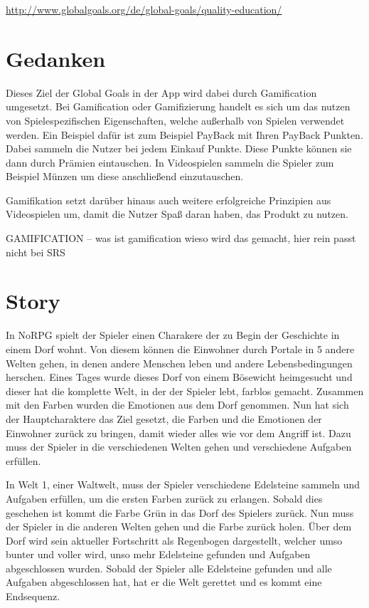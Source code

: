 	\url{http://www.globalgoals.org/de/global-goals/quality-education/}

	
\section{Gedanken}

Dieses Ziel der Global Goals in der App wird dabei durch Gamification umgesetzt. Bei Gamification oder Gamifizierung handelt es sich um das nutzen von Spielespezifischen Eigenschaften, welche außerhalb von Spielen verwendet werden. Ein Beispiel dafür ist zum Beispiel PayBack mit Ihren PayBack Punkten. Dabei sammeln die Nutzer bei jedem Einkauf Punkte. Diese Punkte können sie dann durch Prämien eintauschen. In Videospielen sammeln die Spieler zum Beispiel Münzen um diese anschließend einzutauschen. 

Gamifikation setzt darüber hinaus auch weitere erfolgreiche Prinzipien aus Videospielen um, damit die Nutzer Spaß daran haben, das Produkt zu nutzen.

	GAMIFICATION -- was ist gamification wieso wird das gemacht, hier rein passt nicht bei SRS
	
\section{Story}

In NoRPG spielt der Spieler einen Charakere der zu Begin der Geschichte in einem Dorf wohnt. Von diesem können die Einwohner durch Portale in 5 andere Welten gehen, in denen andere Menschen leben und andere Lebensbedingungen herschen. Eines Tages wurde dieses Dorf von einem Bösewicht heimgesucht und dieser hat die komplette Welt, in der der Spieler lebt, farblos gemacht. Zusammen mit den Farben wurden die Emotionen aus dem Dorf genommen. Nun hat sich der Hauptcharaktere das Ziel gesetzt, die Farben und die Emotionen der Einwohner zurück zu bringen, damit wieder alles wie vor dem Angriff ist. Dazu muss der Spieler in die verschiedenen Welten gehen und verschiedene Aufgaben erfüllen.

In Welt 1, einer Waltwelt, muss der Spieler verschiedene Edelsteine sammeln und Aufgaben erfüllen, um die ersten Farben zurück zu erlangen. Sobald dies geschehen ist kommt die Farbe Grün in das Dorf des Spielers zurück. Nun muss der Spieler in die anderen Welten gehen und die Farbe zurück holen. Über dem Dorf wird sein aktueller Fortschritt als Regenbogen dargestellt, welcher umso bunter und voller wird, unso mehr Edelsteine gefunden und Aufgaben abgeschlossen wurden. Sobald der Spieler alle Edelsteine gefunden und alle Aufgaben abgeschlossen hat, hat er die Welt gerettet und es kommt eine Endsequenz.
	
